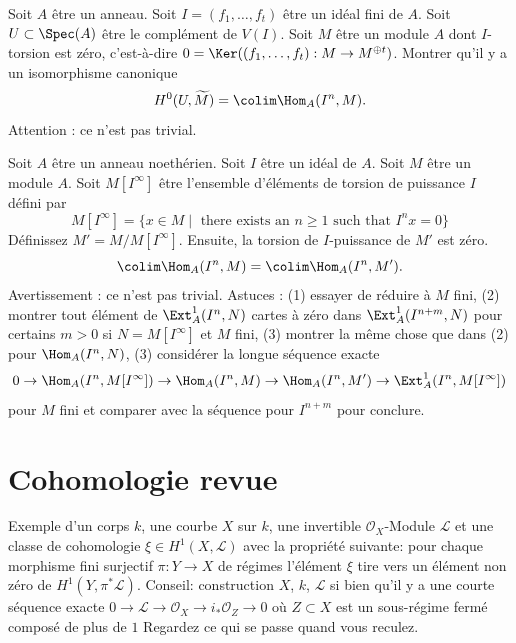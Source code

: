 \begin{exercise}
\label{exercise-h0-complement}
Soit $A$ être un anneau. Soit $I = (f_1, \ldots,
f_t)$ être un idéal fini de $A$. Soit $U \subset
\Spec(A)$ être le complément de $V(I)$. Soit $M$ être un
module $A$ dont $I$-torsion est zéro,
c'est-à-dire $0 = \Ker((f_1, \ldots, f_t) : M \to M^{\oplus
t})$. Montrer qu'il y a un isomorphisme canonique
$$
H^0(U, \widetilde{M}) = \colim \Hom_A(I^n, M).
$$
Attention : ce n'est pas trivial.
\end{exercise}

\begin{exercise}
\label{exercise-Noetherian}
Soit $A$ être un anneau noethérien. Soit $I$ être un idéal de
$A$. Soit $M$ être un module $A$. Soit $M[I^\infty]$ être l'ensemble
d'éléments de torsion de puissance $I$ défini par
$$
M[I^\infty] = \{x \in M \mid
\text{ there exists an }n \geq 1\text{ such that }I^nx = 0\}
$$
Définissez $M' = M/M[I^\infty]$. Ensuite, la torsion de $I$-puissance de $M'$ est
zéro.
$$
\colim \Hom_A(I^n, M) = \colim \Hom_A(I^n, M').
$$
Avertissement : ce n'est pas trivial. Astuces : (1) essayer de réduire à $M$
fini, (2) montrer tout élément de $\Ext^1_A(I^n, N)$
cartes à zéro dans $\Ext^1_A(I^{n + m}, N)$ pour certains $m >
0$ si $N = M[I^\infty]$ et $M$ fini, (3) montrer la même
chose que dans (2) pour $\Hom_A(I^n, N)$, (3) considérer la longue
séquence exacte
$$
0 \to \Hom_A(I^n, M[I^\infty]) \to \Hom_A(I^n, M) \to \Hom_A(I^n, M')
\to \Ext^1_A(I^n, M[I^\infty])
$$
pour $M$ fini et comparer avec la séquence pour $I^{n + m}$ pour conclure.
\end{exercise}








\section{Cohomologie revue}
\label{section-more-more-cohomology}


\begin{exercise}
\label{exercise-nonkillable}
Exemple d'un corps $k$, une courbe $X$ sur
$k$, une invertible $\mathcal{O}_X$-Module $\mathcal{L}$ et une classe de
cohomologie $\xi \in H^1(X, \mathcal{L})$ avec la propriété
suivante: pour chaque morphisme fini surjectif $\pi
: Y \to X$ de régimes l'élément $\xi$ tire
vers un élément non zéro de $H^1(Y, \pi^*\mathcal{L})$. Conseil: construction
$X$, $k$, $\mathcal{L}$ si bien qu'il y a
une courte séquence exacte
$0 \to \mathcal{L} \to \mathcal{O}_X \to i_*\mathcal{O}_Z \to 0$ où
$Z \subset X$ est un sous-régime fermé composé de
plus de $1$ Regardez ce qui se passe quand vous
reculez.
\end{exercise}

